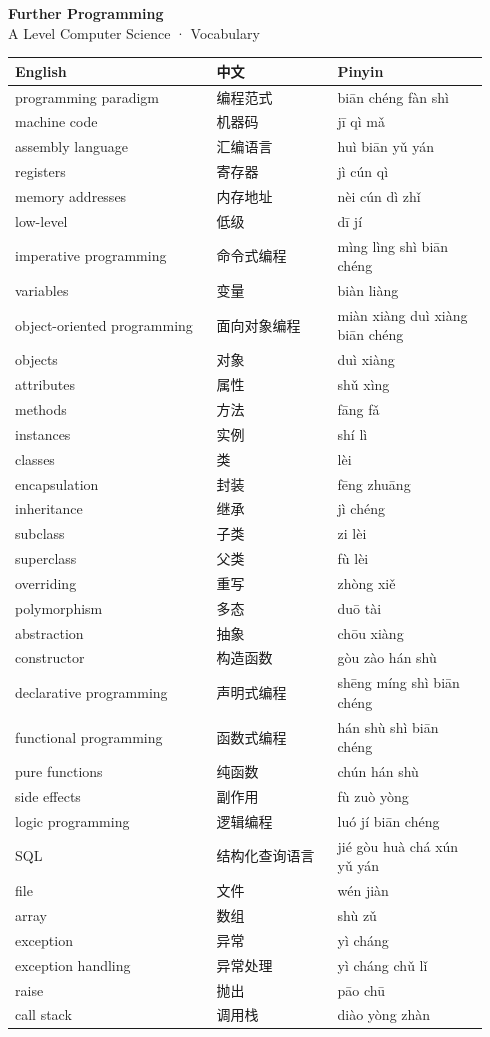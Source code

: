 \documentclass[11pt]{article}
\begin{document}
\begin{center}
  {\LARGE\bfseries Further Programming}\\[0.35em]
  {\large A Level Computer Science · Vocabulary}
\end{center}
\vspace{0.6em}

\begin{longtable}{@{}p{0.40\linewidth}p{0.24\linewidth}p{0.30\linewidth}@{}}
\toprule
\textbf{English} & \textbf{中文} & \textbf{Pinyin} \\
\midrule
\endhead
\bottomrule
\endlastfoot
programming paradigm & 编程范式 & biān chéng fàn shì \\
machine code & 机器码 & jī qì mǎ \\
assembly language & 汇编语言 & huì biān yǔ yán \\
registers & 寄存器 & jì cún qì \\
memory addresses & 内存地址 & nèi cún dì zhǐ \\
low-level & 低级 & dī jí \\
imperative programming & 命令式编程 & mìng lìng shì biān chéng \\
variables & 变量 & biàn liàng \\
object-oriented programming & 面向对象编程 & miàn xiàng duì xiàng biān chéng \\
objects & 对象 & duì xiàng \\
attributes & 属性 & shǔ xìng \\
methods & 方法 & fāng fǎ \\
instances & 实例 & shí lì \\
classes & 类 & lèi \\
encapsulation & 封装 & fēng zhuāng \\
inheritance & 继承 & jì chéng \\
subclass & 子类 & zi lèi \\
superclass & 父类 & fù lèi \\
overriding & 重写 & zhòng xiě \\
polymorphism & 多态 & duō tài \\
abstraction & 抽象 & chōu xiàng \\
constructor & 构造函数 & gòu zào hán shù \\
declarative programming & 声明式编程 & shēng míng shì biān chéng \\
functional programming & 函数式编程 & hán shù shì biān chéng \\
pure functions & 纯函数 & chún hán shù \\
side effects & 副作用 & fù zuò yòng \\
logic programming & 逻辑编程 & luó jí biān chéng \\
SQL & 结构化查询语言 & jié gòu huà chá xún yǔ yán \\
file & 文件 & wén jiàn \\
array & 数组 & shù zǔ \\
exception & 异常 & yì cháng \\
exception handling & 异常处理 & yì cháng chǔ lǐ \\
raise & 抛出 & pāo chū \\
call stack & 调用栈 & diào yòng zhàn \\
\end{longtable}
\end{document}
